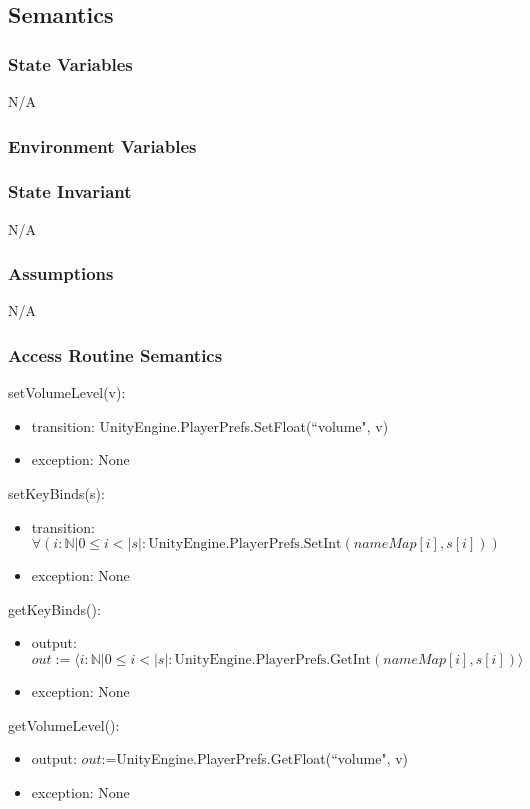 \documentclass[12pt]{article}
\begin{document}
\subsection {Semantics}

\subsubsection {State Variables}
N/A

\subsubsection {Environment Variables}

\subsubsection {State Invariant}
N/A
\subsubsection {Assumptions}
N/A
\subsubsection {Access Routine Semantics}

\noindent setVolumeLevel(v):
\begin{itemize}
	\item transition: UnityEngine.PlayerPrefs.SetFloat(``volume", v)
	\item exception: None
\end{itemize}

\noindent setKeyBinds(s):
\begin{itemize}
	\item transition: $\forall(i: \mathbb{N} | 0 \leq i < |s|: \text{UnityEngine.PlayerPrefs.SetInt}(nameMap[i], s[i]))$
	\item exception: None
\end{itemize}

\noindent getKeyBinds():
\begin{itemize}
	\item output: $out:=\langle i: \mathbb{N} | 0 \leq i < |s|: \text{UnityEngine.PlayerPrefs.GetInt}(nameMap[i], s[i]) \rangle$
	\item exception: None
\end{itemize}

\noindent getVolumeLevel():
\begin{itemize}
	\item output: $out$:=UnityEngine.PlayerPrefs.GetFloat(``volume", v)
	\item exception: None
\end{itemize}
\end{document}
